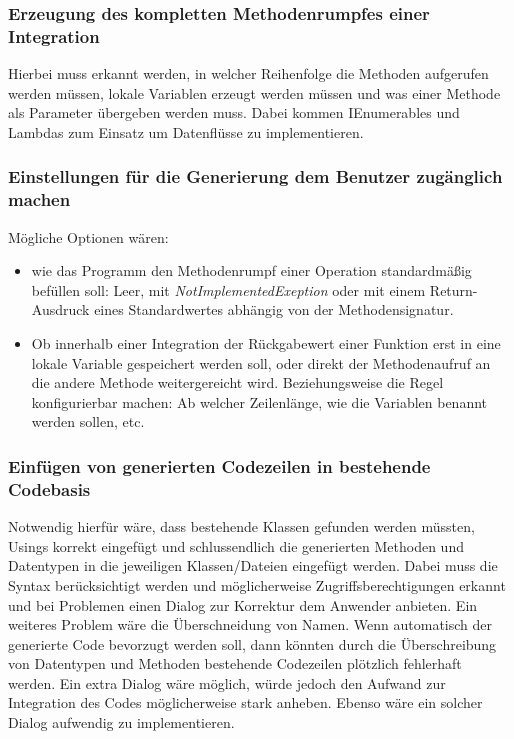 \subsubsection{Erzeugung des kompletten Methodenrumpfes einer Integration}

Hierbei muss erkannt werden, in welcher Reihenfolge die Methoden aufgerufen
werden müssen, lokale Variablen erzeugt werden müssen und was einer Methode als Parameter
übergeben werden muss. Dabei kommen IEnumerables und Lambdas zum Einsatz um
Datenflüsse zu implementieren.

\subsubsection{Einstellungen für die Generierung dem Benutzer zugänglich machen
}
Mögliche Optionen wären:
\begin{itemize}
\item wie das Programm den Methodenrumpf einer Operation
standardmäßig befüllen soll: Leer, mit \textit{NotImplementedExeption} oder mit einem
Return-Ausdruck eines Standardwertes abhängig von der Methodensignatur.
\end{itemize}
\begin{itemize}
\item Ob innerhalb einer Integration der Rückgabewert einer Funktion erst in eine
lokale Variable gespeichert werden soll, oder direkt der Methodenaufruf an die
andere Methode weitergereicht wird. Beziehungsweise die Regel konfigurierbar
machen: Ab welcher Zeilenlänge, wie die Variablen benannt werden sollen, etc.
\end{itemize}

\subsubsection{Einfügen von generierten Codezeilen in bestehende Codebasis}

Notwendig hierfür wäre, dass bestehende Klassen gefunden werden müssten, Usings korrekt
eingefügt und schlussendlich die generierten Methoden und Datentypen in die
jeweiligen Klassen/Dateien eingefügt werden. Dabei muss die Syntax
berücksichtigt werden und möglicherweise Zugriffsberechtigungen erkannt und bei
Problemen einen Dialog zur Korrektur dem Anwender anbieten. Ein weiteres Problem
wäre die Überschneidung von Namen. Wenn automatisch der generierte Code bevorzugt
  werden soll, dann könnten durch die Überschreibung von Datentypen und Methoden
  bestehende Codezeilen plötzlich fehlerhaft werden. Ein extra Dialog wäre
  möglich, würde jedoch den Aufwand zur Integration des Codes möglicherweise stark
  anheben. Ebenso wäre ein solcher Dialog aufwendig zu implementieren.
 
